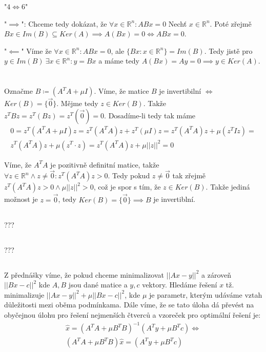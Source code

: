 \documentclass[12pt, a4paper]{article}
\begin{document}
"$4 \iff 6$"

"$\implies$": Chceme tedy dokázat, že $\forall x \in \mathbb{R}^n: ABx=0$ Nechť $x \in \mathbb{R}^n$. Poté zřejmě $Bx \in Im(B) \subseteq Ker(A) \implies A(Bx)=0 \iff ABx=0$.

"$\impliedby$" Víme že $\forall x \in \mathbb{R}^n: ABx=0$, ale $\{Bx : x \in \mathbb{R}^n\}=Im(B)$. Tedy jistě pro $y \in Im(B) \ \exists x \in \mathbb{R}^n: y=Bx$ a máme tedy $A(Bx)=Ay=0 \implies y \in Ker(A)$.
\section{}
\subsection{}
Označme $B \coloneqq (A^T A+ \mu I)$. Víme, že matice $B$ je invertibilní $\iff$ $Ker(B)=\{\vec{0}\}$. Mějme tedy $z \in Ker(B)$. Takže $z^T B z = z^T(Bz)= z^T(\vec{0})=0$. Dosadíme-li tedy tak máme
\begin{gather*}
0=z^T(A^T A+ \mu I)z=z^T(A^T A)z + z^T(\mu I)z = z^T(A^T A)z + \mu (z^T I z) =\\
z^T(A^T A)z + \mu (z^T \cdot z)=z^T(A^T A)z + \mu||z||^2=0
\end{gather*}

Víme, že $A^T A$ je pozitivně definitní matice, takže $\forall z \in \mathbb{R}^n \land z \neq \vec{0}: z^T(A^T A)z > 0$. Tedy pokud $z \neq \vec{0}$ tak zřejmě $z^T(A^T A)z >0 \land  \mu||z||^2 > 0$, což je spor s tím, že $z \in Ker(B)$. Takže jediná možnost je $z=\vec{0}$, tedy $Ker(B)=\{\vec{0}\} \implies B$ je invertiblní.

\subsection{}
???

\subsection{}
???

\subsection{}
Z přednášky víme, že pokud chceme minimalizovat $||Ax-y||^2$ a zároveň $||Bx-c||^2$ kde $A,B$ jsou dané matice a $y,c$ vektory. Hledáme řešení $x$ tž. minimalizuje $||Ax-y||^2+\mu||Bx-c||^2$, kde $\mu$ je parametr, kterým udáváme vztah důležitosti mezi oběma podmínkama. Dále víme, že se tato úloha dá převést na obyčejnou úlohu pro řešení nejmenších čtverců a vzoreček pro optimální řešení je:
\begin{gather*}
\hat{x}=(A^TA+\mu B^T B)^{-1} (A^Ty+ \mu B^Tc) \iff\\
(A^TA+\mu B^T B)\hat{x}= (A^Ty+ \mu B^Tc) 
\end{gather*}
\end{document}
